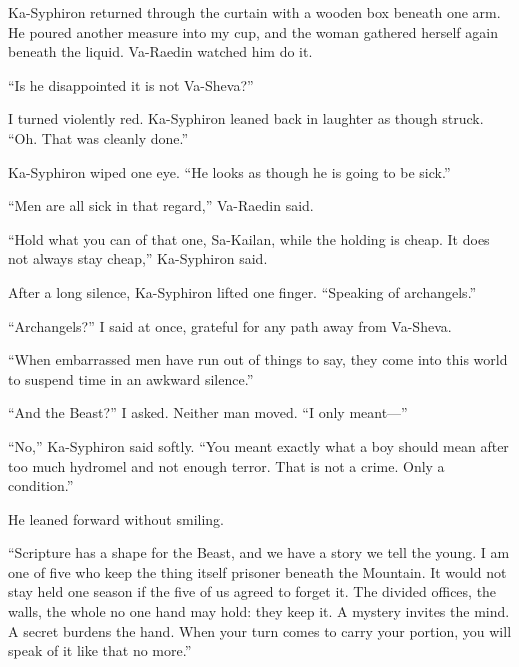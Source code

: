 Ka-Syphiron returned through the curtain with a wooden box beneath one arm. He poured another measure into my cup, and the woman gathered herself again beneath the liquid. Va-Raedin watched him do it.\par

``Is he disappointed it is not Va-Sheva?''\par

I turned violently red. Ka-Syphiron leaned back in laughter as though struck. ``Oh. That was cleanly done.''\par

Ka-Syphiron wiped one eye. ``He looks as though he is going to be sick.''\par

``Men are all sick in that regard,'' Va-Raedin said.\par

``Hold what you can of that one, Sa-Kailan, while the holding is cheap. It does not always stay cheap,'' Ka-Syphiron said.\par

After a long silence, Ka-Syphiron lifted one finger. ``Speaking of archangels.''\par

``Archangels?'' I said at once, grateful for any path away from Va-Sheva.\par

``When embarrassed men have run out of things to say, they come into this world to suspend time in an awkward silence.''\par

``And the Beast?'' I asked. Neither man moved. ``I only meant---''\par

``No,'' Ka-Syphiron said softly. ``You meant exactly what a boy should mean after too much hydromel and not enough terror. That is not a crime. Only a condition.''\par

He leaned forward without smiling.\par

``Scripture has a shape for the Beast, and we have a story we tell the young. I am one of five who keep the thing itself prisoner beneath the Mountain. It would not stay held one season if the five of us agreed to forget it. The divided offices, the walls, the whole no one hand may hold: they keep it. A mystery invites the mind. A secret burdens the hand. When your turn comes to carry your portion, you will speak of it like that no more.''\par

